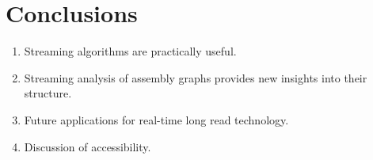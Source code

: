\documentclass[preprint,number,12pt]{elsarticle}
\begin{document}
\section{Conclusions}\label{sec:conclusions}

\begin{enumerate}
	\item Streaming algorithms are practically useful.
	\item Streaming analysis of assembly graphs provides new insights into their structure.
	\item Future applications for real-time long read technology.
	\item Discussion of accessibility.
\end{enumerate}




\listoftodos
\end{document}
